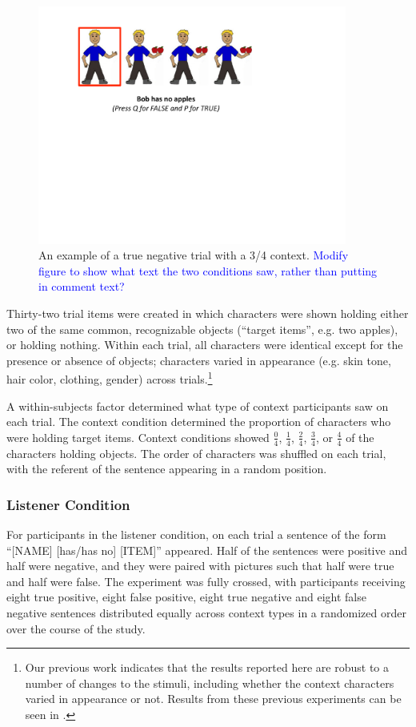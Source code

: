 \documentclass[man, noapacite]{apa2}
\begin{document}
\begin{figure}[t]
\begin{center} 
\includegraphics[width=4in]{figures/trialfig.pdf}
\caption{\label{fig:trial} An example of a true negative trial with a 3/4 context. \textcolor{blue}{Modify figure to show what text the two conditions saw, rather than putting in comment text?}}
\vspace{-5mm}
\end{center} 
\end{figure}

Thirty-two trial items were created in which characters were shown holding either two of the same common, recognizable objects (``target items'', e.g. two apples), or holding nothing.  Within each trial, all characters were identical except for the presence or absence of objects; characters varied in appearance (e.g. skin tone, hair color, clothing, gender) across trials.\footnote{Our previous work indicates that the results reported here are robust to a number of changes to the stimuli, including whether the context characters varied in appearance or not.  Results from these previous experiments can be seen in .}

A within-subjects factor determined what type of context participants saw on each trial.  The context condition determined the proportion of characters who were holding target items.  Context conditions showed $\frac{0}{4}$, $\frac{1}{4}$, $\frac{2}{4}$, $\frac{3}{4}$, or $\frac{4}{4}$ of the characters holding objects. The order of characters was shuffled on each trial, with the referent of the sentence appearing in a random position.  

\subsubsection{Listener Condition}
For participants in the listener condition, on each trial a sentence of the form ``[NAME] [has/has no] [ITEM]'' appeared.  Half of the sentences were positive and half were negative, and they were paired with pictures such that half were true and half were false.  The experiment was fully crossed, with participants receiving eight true positive, eight false positive, eight true negative and eight false negative sentences distributed equally across context types in a randomized order over the course of the study.  
\end{document}
